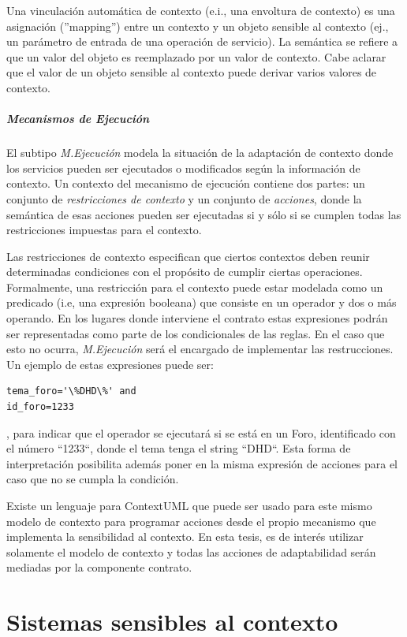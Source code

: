 Una vinculación automática de contexto (e.i., una envoltura de contexto) es
una asignación (''mapping'') entre un contexto y un objeto sensible al
contexto (ej., un parámetro de entrada de una operación de servicio). La
semántica se refiere a que un valor del objeto es reemplazado por un valor de contexto.
Cabe aclarar que el valor de un objeto sensible al contexto puede derivar varios
valores de contexto. 
 

\subparagraph{Mecanismos de Ejecución}

El subtipo \textit{M.Ejecución} modela la situación de la adaptación de
contexto
donde los servicios pueden ser ejecutados o modificados según la información
de contexto. Un contexto del mecanismo de ejecución contiene dos partes: un
conjunto de \textit{restricciones de contexto} y un conjunto de
\textit{acciones}, donde la semántica de esas acciones pueden ser ejecutadas si
y sólo si se cumplen todas las restricciones impuestas para el contexto. 

Las restricciones de contexto especifican que ciertos contextos deben reunir
determinadas condiciones con el propósito de cumplir ciertas operaciones.
Formalmente, una restricción para el contexto puede estar modelada como un
predicado \cite{ContextUML} (i.e, una expresión booleana) que consiste en un
operador y dos o más operando. En los lugares donde interviene el contrato
estas expresiones podrán ser representadas como parte de los condicionales
de las reglas. En el caso que esto no ocurra, \textit{M.Ejecución} será el
encargado de implementar las restrucciones. Un ejemplo de estas expresiones
puede ser: \begin{verbatim}tema_foro='\%DHD\%' and
id_foro=1233\end{verbatim}, para indicar que el operador se ejecutará si se
está en un Foro, identificado con el número ``1233``, donde el tema tenga el
string ``DHD``. Esta forma de interpretación posibilita además poner en
la misma expresión de acciones para el caso que no se cumpla la condición.

Existe un lenguaje para ContextUML \cite{ContextUML} que puede ser usado para
este mismo modelo de contexto para programar acciones desde el propio
mecanismo que implementa la sensibilidad al contexto. En esta tesis, es de
interés utilizar solamente el modelo de contexto y todas las acciones de
adaptabilidad serán mediadas por la componente contrato. 

\section{Sistemas sensibles al contexto} \label{sec:cas}


